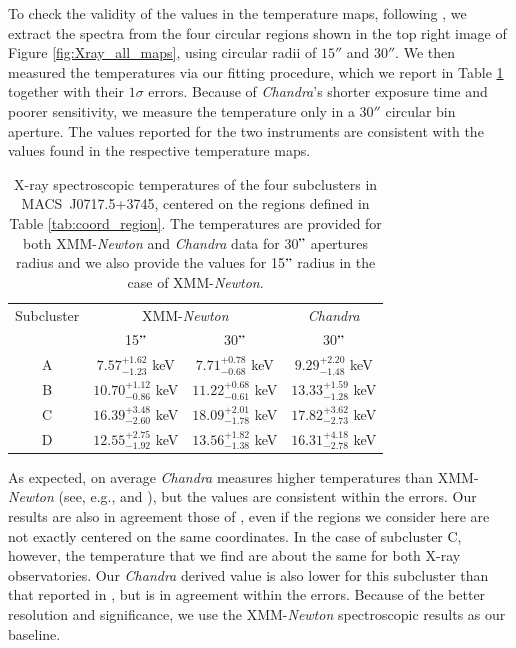 \documentclass[twocolumn,traditabstract]{aa}
\begin{document}
To check the validity of the values in the temperature maps, following \cite{wang2016}, we extract the spectra from the four circular regions shown in the top right image of Figure \ref{fig:Xray_all_maps}, using circular radii of $15''$ and $30''$. We then measured the temperatures via our fitting procedure, which we report in Table \ref{tab:subcluster_Tx_measurements} together with their $1\sigma$ errors. Because of \textit{Chandra}'s shorter exposure time and poorer sensitivity, we measure the temperature only in a $30''$ circular bin aperture. The values reported for the two instruments are consistent with the values found in the respective temperature maps.
\begin{table}[h]
\caption{{\footnotesize X-ray spectroscopic temperatures of the four subclusters in \mbox{MACS~J0717.5+3745}, centered on the regions defined in Table \ref{tab:coord_region}. The temperatures are provided for both XMM-\textit{Newton} and \textit{Chandra} data for 30$"$ apertures radius and we also provide the values for 15$"$ radius in the case of XMM-\textit{Newton}.}}
\begin{center}
\begin{tabular}{cccc}
\hline
\hline
Subcluster & \multicolumn{2}{c}{XMM-\textit{Newton}} & \textit{Chandra} \\
 & 15$"$ & 30$"$ & 30$"$ \\
\hline
A & $  7.57^{+1.62}_{-1.23}$ keV & $  7.71^{+0.78}_{-0.68}$ keV & $  9.29^{+2.20}_{-1.48}$ keV \\
B & $10.70^{+1.12}_{-0.86}$ keV & $11.22^{+0.68}_{-0.61}$ keV & $13.33^{+1.59}_{-1.28}$ keV \\
C & $16.39^{+3.48}_{-2.60}$ keV & $18.09^{+2.01}_{-1.78}$ keV & $17.82^{+3.62}_{-2.73}$ keV \\
D & $12.55^{+2.75}_{-1.92}$ keV & $13.56^{+1.82}_{-1.38}$ keV & $16.31^{+4.18}_{-2.78}$ keV \\
\hline
\end{tabular}
\end{center}
\label{tab:subcluster_Tx_measurements}
\end{table}
As expected, on average \textit{Chandra} measures higher temperatures than XMM-\textit{Newton} (see, e.g., \citealt{martino2014} and \citealt{schellenberger2015}), but the values are consistent within the errors. Our results are also in agreement those of \cite{Sayers2013}, even if the regions we consider here are not exactly centered on the same coordinates. In the case of subcluster C, however, the temperature that we find are about the same for both X-ray observatories. Our \textit{Chandra} derived value is also lower for this subcluster than that reported in \cite{Sayers2013}, but is in agreement within the errors. Because of the better resolution and significance, we use the XMM-\textit{Newton} spectroscopic results as our baseline.
\end{document}
